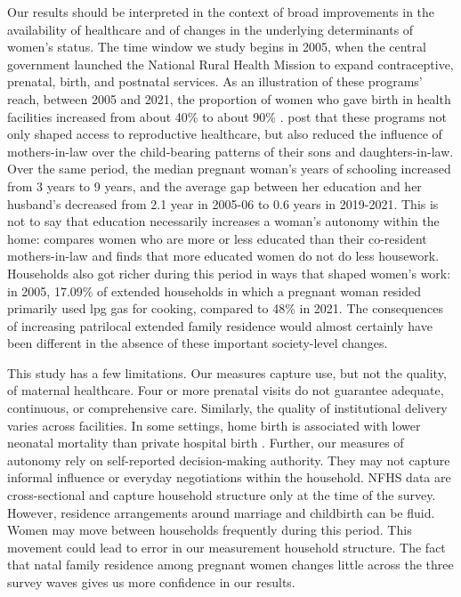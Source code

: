 \documentclass[12pt]{article}
\begin{document}
Our results should be interpreted in the context of broad improvements in the availability of healthcare and of changes in the underlying determinants of women's status.  The time window we study begins in 2005, when the central government launched the National Rural Health Mission to expand contraceptive, prenatal, birth, and postnatal services.  As an illustration of these programs' reach, between 2005 and 2021, the proportion of women who gave birth in health facilities increased from about 40\% to about 90\% \cite{IIPS2007NFHS3,IIPS2021NFHS5}.  \cite{char2010influence} post that these programs not only shaped access to reproductive healthcare, but also reduced the influence of mothers-in-law over the child-bearing patterns of their sons and daughters-in-law.  Over the same period, the median pregnant woman's years of schooling increased from 3 years to 9 years, and the average gap between her education and her husband's decreased from 2.1 year in 2005-06 to 0.6 years in 2019-2021.  This is not to say that education necessarily increases a woman's autonomy within the home: \cite{srivastava2020time} compares women who are more or less educated than their co-resident mothers-in-law and finds that more educated women do not do less housework.  Households also got richer during this period in ways that shaped women's work: in 2005, 17.09\% of extended households in which a pregnant woman resided primarily used lpg gas  for cooking, compared to 48\% in 2021.  The consequences of increasing patrilocal extended family residence would almost certainly have been different in the absence of these important society-level changes.

This study has a few limitations. Our measures capture use, but not the quality, of maternal healthcare. Four or more prenatal visits do not guarantee adequate, continuous, or comprehensive care. Similarly, the quality of institutional delivery varies across facilities.  In some settings, home birth is associated with lower neonatal mortality than private hospital birth \cite{coffey2025excess}. Further, our measures of autonomy rely on self-reported decision-making authority. They may not capture informal influence or everyday negotiations within the household. NFHS data are cross-sectional and capture household structure only at the time of the survey. However, residence arrangements around marriage and childbirth can be fluid. Women may move between households frequently during this period. This movement could lead to error in our measurement household structure.  The fact that natal family residence among pregnant women changes little across the three survey waves gives us more confidence in our results.
\end{document}
